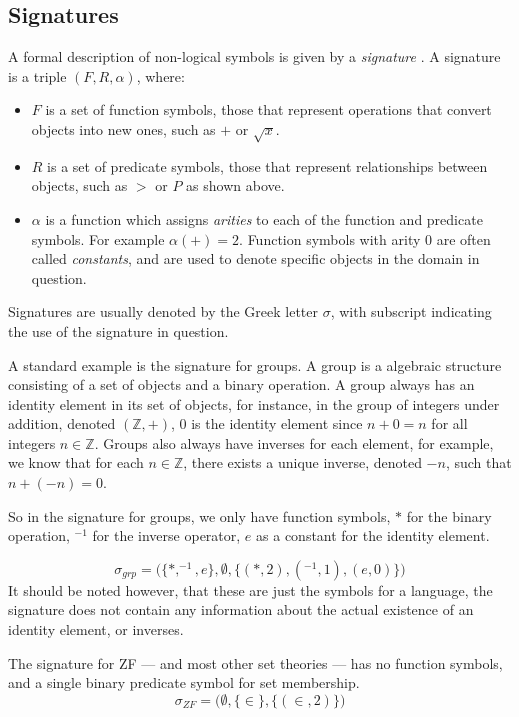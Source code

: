 \documentclass[11pt]{report}
\theoremstyle{definition}
\theoremstyle{theorem}
\theoremstyle{lemma}
\begin{document}
\subsection{Signatures}
A formal description of non-logical symbols is
given by a \emph{signature} \cite[ch. 1.1]{selinger}. A signature is a triple $(F,R,\alpha)$, where:
\begin{itemize}
\item $F$ is a set of function symbols, those that represent operations that convert objects into new ones, such as $+$ or $\sqrt{x}$.
\item $R$ is a set of predicate symbols, those that represent relationships between objects, such as $>$ or $P$ as shown above.
\item $\alpha$ is a function which assigns \emph{arities} to each of the function and predicate symbols.
For example $\alpha(+) = 2$. Function symbols with arity $0$ are often called \emph{constants}, and are used to denote specific objects in the domain in question.
\end{itemize}
Signatures are usually denoted by the Greek letter $\sigma$, with subscript indicating the use of the signature in question.

A standard example is the signature for groups.
A group is a algebraic structure consisting of a set of objects and a binary operation.
A group always has an identity element in its set of objects, for instance, in the group of integers under addition, denoted $(\mathbb{Z}, +)$, $0$ is the identity element since $n + 0 = n$ for all integers $n\in\mathbb{Z}$.
Groups also always have inverses for each element, for example, we know that for each $n\in\mathbb{Z}$, there exists a unique inverse, denoted $-n$, such that $n + (-n) = 0$.

So in the signature for groups, we only have function symbols, $*$ for the binary operation, $^{-1}$ for the inverse operator, $e$ as a constant for the identity element.

$$\sigma_{\mathit{grp}} = \big(\{*,^{-1}, e\},\emptyset,\{(*, 2), (^{-1}, 1),(e,0)\}\big)$$
It should be noted however, that these are just the symbols for a language, the signature does not contain any information about the actual existence of an identity element, or inverses.

The signature for ZF --- and most other set theories --- has no function symbols, and a single binary predicate symbol for set membership.
$$\sigma_{\mathit{ZF}} = \big(\emptyset,\{\in\},\{(\in, 2)\})$$
\end{document}
